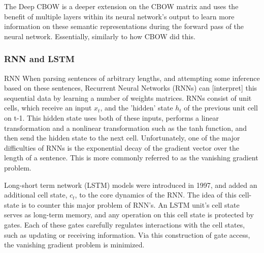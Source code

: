 The Deep CBOW is a deeper extension on the CBOW matrix and uses the benefit of
multiple layers within its neural network's output to learn more information on
these semantic representations during the forward pass of the neural network.
Essentially,  similarly to how CBOW did this. 


\subsubsection{RNN and LSTM}
RNN
When parsing sentences of arbitrary lengths, and attempting some inference based
on these sentences, Recurrent Neural Networks (RNNs) can [interpret] this
sequential data by learning a number of weights matrices. RNNs consist of unit
cells, which receive an input $x_t$, and the 'hidden' state $h_t$ of the
previous unit cell on t-1. This hidden state uses both of these inputs, performs
a linear transformation and a nonlinear transformation such as the tanh
function, and then send the hidden state to the next cell. Unfortunately, one of
the major difficulties of RNNs is the exponential decay of the gradient vector
over the length of a sentence\cite{bengio1994learning}. This is more commonly
referred to as the vanishing gradient problem.

Long-short term network (LSTM) models \cite{hochreiter1997long} were introduced
in 1997, and added an additional cell state, $c_t$, to the core dynamics of the
RNN. The idea of this cell-state is to counter this major problem of RNN's. An
LSTM unit's cell state serves as long-term memory, and any operation on this
cell state is protected by gates. Each of these gates carefully regulates
interactions with the cell states, such as updating or receiving information.
Via this construction of gate access, the vanishing gradient problem is
minimized.
